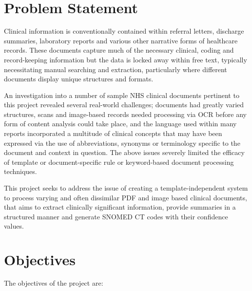 \section{Problem Statement}

Clinical information is conventionally contained within referral letters, discharge summaries, laboratory reports and various other narrative forms of healthcare records. These documents capture much of the necessary clinical, coding and record-keeping information but the data is locked away within free text, typically necessitating manual searching and extraction, particularly where different documents display unique structures and formats.

An investigation into a number of sample NHS clinical documents pertinent to this project revealed several real-world challenges; documents had greatly varied structures, scans and image-based records needed processing via OCR before any form of content analysis could take place, and the language used within many reports incorporated a multitude of clinical concepts that may have been expressed via the use of abbreviations, synonyms or terminology specific to the document and context in question. The above issues severely limited the efficacy of template or document-specific rule or keyword-based document processing techniques.

This project seeks to address the issue of creating a template-independent system to process varying and often dissimilar PDF and image based clinical documents, that aims to extract clinically significant information, provide summaries in a structured manner and generate SNOMED CT codes with their confidence values.

\section{Objectives}

The objectives of the project are:


